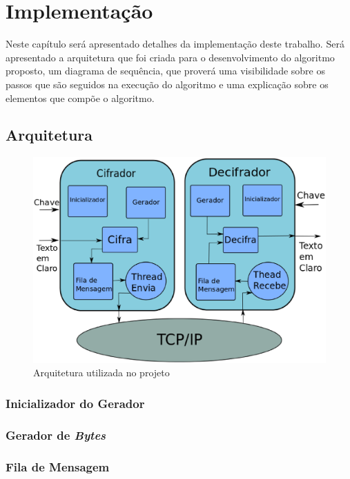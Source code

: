 \chapter{Implementação}
\label{implementation-algorithm}

Neste capítulo será apresentado detalhes da implementação deste trabalho. Será apresentado a arquitetura que foi criada para o desenvolvimento do algoritmo proposto, um diagrama de sequência, que proverá uma visibilidade sobre os passos que são seguidos na execução do algoritmo e uma explicação sobre os elementos que compõe o algoritmo.

\section{Arquitetura}

\begin{figure}[h]
	\centering
	\includegraphics[scale=0.6]{figuras/architecture.eps}
	\caption{Arquitetura utilizada no projeto}
	\label{architecture}
\end{figure}

\subsection{Inicializador do Gerador}

\subsection{Gerador de \textit{Bytes}}

\subsection{Fila de Mensagem}

